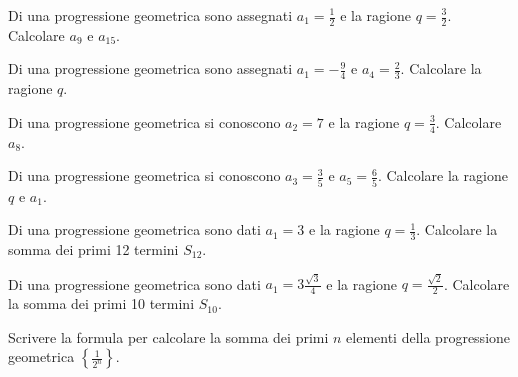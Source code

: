\begin{esercizio}
\label{ese:8a_progr.27}
Di una progressione geometrica sono assegnati $a_1=\frac{1}{2}$ e la ragione $q=\frac{3}{2}$. Calcolare $a_9$ e $a_{15}$.
\end{esercizio}

\begin{esercizio}
\label{ese:8a_progr.28}
Di una progressione geometrica sono assegnati $a_1=-\frac{9}{4}$ e $a_4=\frac{2}{3}$. Calcolare la ragione $q$.
\end{esercizio}

\begin{esercizio}
\label{ese:8a_progr.29}
Di una progressione geometrica si conoscono $a_2=7$ e la ragione $q=\frac{3}{4}$. Calcolare $a_8$.
\end{esercizio}

\begin{esercizio}
\label{ese:8a_progr.30}
Di una progressione geometrica si conoscono $a_3=\frac{3}{5}$ e $a_5=\frac{6}{5}$. Calcolare la ragione $q$ e $a_1$.
\end{esercizio}

\begin{esercizio}
\label{ese:8a_progr.31}
Di una progressione geometrica sono dati $a_1=3$ e la ragione $q=\frac{1}{3}$. Calcolare la somma dei primi 12 termini $S_{12}$.
\end{esercizio}

\begin{esercizio}
\label{ese:8a_progr.32}
Di una progressione geometrica sono dati $a_1=3\frac{\sqrt{3}}{4}$ e la ragione $q=\frac{\sqrt{2}}{2}$. Calcolare la somma dei primi 10 termini $S_{10}$.
\end{esercizio}

\begin{esercizio}
\label{ese:8a_progr.33}
Scrivere la formula per calcolare la somma dei primi $n$ elementi della progressione geometrica $\left\{\frac{1}{2^n}\right\}$.
\end{esercizio}


